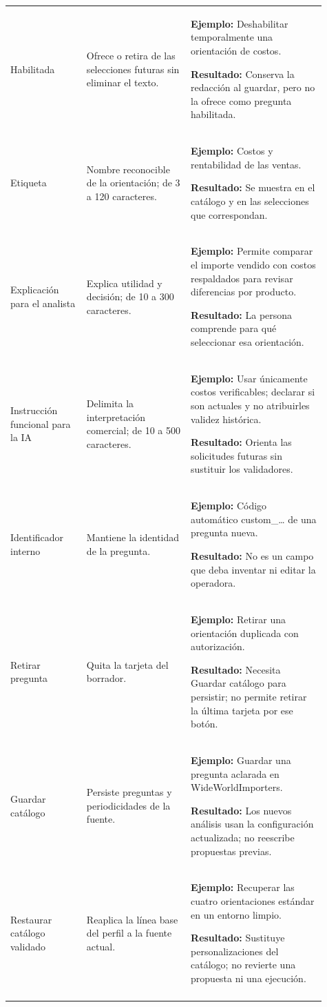 \begin{longtable}{@{}>{\RaggedRight\arraybackslash}p{0.22\linewidth}>{\RaggedRight\arraybackslash}p{0.3\linewidth}>{\RaggedRight\arraybackslash}p{0.39\linewidth}@{}}
\addlinespace[3pt]
Habilitada & Ofrece o retira de las selecciones futuras sin eliminar el texto. & \textbf{Ejemplo:} Deshabilitar temporalmente una orientación de costos.\par\smallskip\textbf{Resultado:} Conserva la redacción al guardar, pero no la ofrece como pregunta habilitada. \\
\addlinespace[3pt]
Etiqueta & Nombre reconocible de la orientación; de 3 a 120 caracteres. & \textbf{Ejemplo:} Costos y rentabilidad de las ventas.\par\smallskip\textbf{Resultado:} Se muestra en el catálogo y en las selecciones que correspondan. \\
\addlinespace[3pt]
Explicación para el analista & Explica utilidad y decisión; de 10 a 300 caracteres. & \textbf{Ejemplo:} Permite comparar el importe vendido con costos respaldados para revisar diferencias por producto.\par\smallskip\textbf{Resultado:} La persona comprende para qué seleccionar esa orientación. \\
\addlinespace[3pt]
Instrucción funcional para la IA & Delimita la interpretación comercial; de 10 a 500 caracteres. & \textbf{Ejemplo:} Usar únicamente costos verificables; declarar si son actuales y no atribuirles validez histórica.\par\smallskip\textbf{Resultado:} Orienta las solicitudes futuras sin sustituir los validadores. \\
\addlinespace[3pt]
Identificador interno & Mantiene la identidad de la pregunta. & \textbf{Ejemplo:} Código automático custom\_\allowbreak{}… de una pregunta nueva.\par\smallskip\textbf{Resultado:} No es un campo que deba inventar ni editar la operadora. \\
\addlinespace[3pt]
Retirar pregunta & Quita la tarjeta del borrador. & \textbf{Ejemplo:} Retirar una orientación duplicada con autorización.\par\smallskip\textbf{Resultado:} Necesita Guardar catálogo para persistir; no permite retirar la última tarjeta por ese botón. \\
\addlinespace[3pt]
Guardar catálogo & Persiste preguntas y periodicidades de la fuente. & \textbf{Ejemplo:} Guardar una pregunta aclarada en WideWorldImporters.\par\smallskip\textbf{Resultado:} Los nuevos análisis usan la configuración actualizada; no reescribe propuestas previas. \\
\addlinespace[3pt]
Restaurar catálogo validado & Reaplica la línea base del perfil a la fuente actual. & \textbf{Ejemplo:} Recuperar las cuatro orientaciones estándar en un entorno limpio.\par\smallskip\textbf{Resultado:} Sustituye personalizaciones del catálogo; no revierte una propuesta ni una ejecución. \\
\addlinespace[3pt]
\end{longtable}
\endgroup

